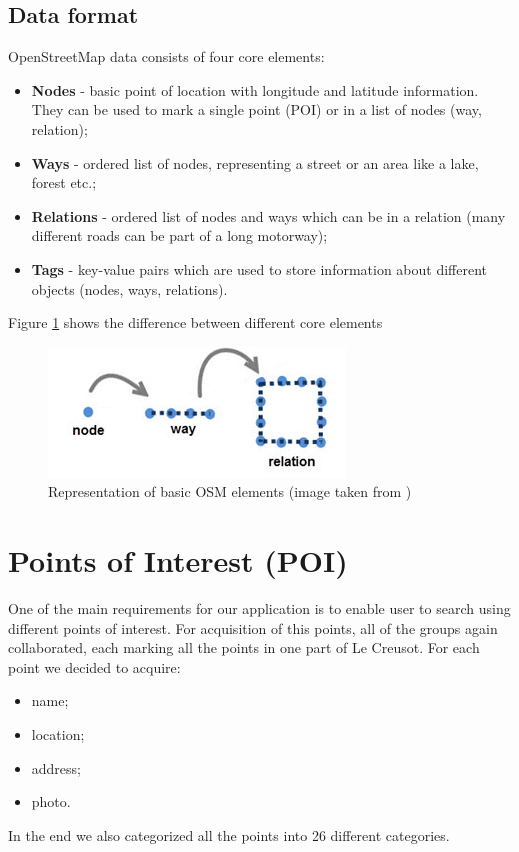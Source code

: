 \subsection{Data format}
OpenStreetMap data consists of four core elements:
\begin{itemize}
\item \textbf{Nodes} - basic point of location with longitude and latitude information. They can be used to mark a single point (POI) or in a list of nodes (way, relation);
\item \textbf{Ways} - ordered list of nodes, representing a street or an area like a lake, forest etc.;
\item \textbf{Relations} - ordered list of nodes and ways which can be in a relation (many different roads can be part of a long motorway);
\item \textbf{Tags} - key-value pairs which are used to store information about different objects (nodes, ways, relations).
\end{itemize}
Figure \ref{fig:Osm_flow} shows the difference between different core elements
\begin{figure}[h]
\centering
\includegraphics{../pictures/osm_flow.png}
\caption{Representation of basic OSM elements (image taken from \cite{osm_2})}
\label{fig:Osm_flow}
\end{figure}

\section{Points of Interest (POI)}
One of the main requirements for our application is to enable user to search using different points of interest. For acquisition of this points, all of the groups again collaborated, each marking all the points in one part of Le Creusot. For each point we decided to acquire:
\begin{itemize}
\item name;
\item location;
\item address;
\item photo.
\end{itemize}
In the end we also categorized all the points into 26 different categories. 
